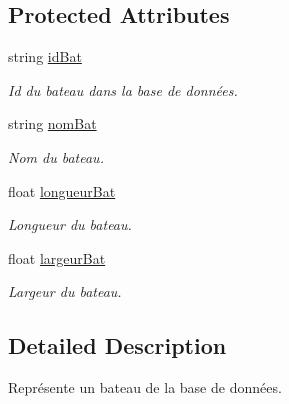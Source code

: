 \subsection*{Protected Attributes}
\begin{DoxyCompactItemize}
\item 
\hypertarget{class_bateau_a5ce29bf4efa08197438bacf6025f44b1}{string \hyperlink{class_bateau_a5ce29bf4efa08197438bacf6025f44b1}{id\-Bat}}\label{class_bateau_a5ce29bf4efa08197438bacf6025f44b1}

\begin{DoxyCompactList}\small\item\em Id du bateau dans la base de données. \end{DoxyCompactList}\item 
\hypertarget{class_bateau_a31fbdfe6a50a4cbd3c61dcac505f55be}{string \hyperlink{class_bateau_a31fbdfe6a50a4cbd3c61dcac505f55be}{nom\-Bat}}\label{class_bateau_a31fbdfe6a50a4cbd3c61dcac505f55be}

\begin{DoxyCompactList}\small\item\em Nom du bateau. \end{DoxyCompactList}\item 
\hypertarget{class_bateau_a6c1f8f9f5bb656fae6ce59bcfa6fe8aa}{float \hyperlink{class_bateau_a6c1f8f9f5bb656fae6ce59bcfa6fe8aa}{longueur\-Bat}}\label{class_bateau_a6c1f8f9f5bb656fae6ce59bcfa6fe8aa}

\begin{DoxyCompactList}\small\item\em Longueur du bateau. \end{DoxyCompactList}\item 
\hypertarget{class_bateau_ace3ced3b9bb6506a913645230b85022c}{float \hyperlink{class_bateau_ace3ced3b9bb6506a913645230b85022c}{largeur\-Bat}}\label{class_bateau_ace3ced3b9bb6506a913645230b85022c}

\begin{DoxyCompactList}\small\item\em Largeur du bateau. \end{DoxyCompactList}\end{DoxyCompactItemize}


\subsection{Detailed Description}
Représente un bateau de la base de données. 

